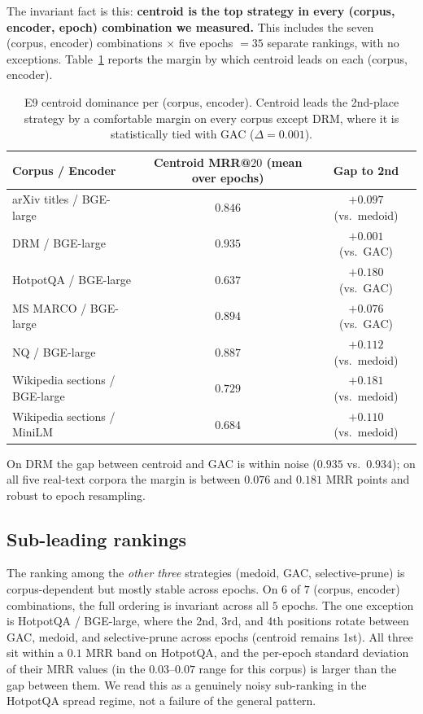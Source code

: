 The invariant fact is this: \textbf{centroid is the top strategy in
every (corpus, encoder, epoch) combination we measured.} This
includes the seven (corpus, encoder) combinations
$\times$ five epochs $= 35$ separate rankings, with no exceptions.
Table~\ref{tab:e9-centroid} reports the margin by which centroid
leads on each (corpus, encoder).

\begin{table}[h]
\centering
\small
\begin{tabular}{lcc}
\toprule
Corpus / Encoder & Centroid MRR@$20$ (mean over epochs) & Gap to 2nd \\
\midrule
arXiv titles / BGE-large        & $0.846$ & $+0.097$ (vs.\ medoid) \\
DRM / BGE-large                  & $0.935$ & $+0.001$ (vs.\ GAC) \\
HotpotQA / BGE-large             & $0.637$ & $+0.180$ (vs.\ GAC) \\
MS MARCO / BGE-large             & $0.894$ & $+0.076$ (vs.\ GAC) \\
NQ / BGE-large                   & $0.887$ & $+0.112$ (vs.\ medoid) \\
Wikipedia sections / BGE-large   & $0.729$ & $+0.181$ (vs.\ medoid) \\
Wikipedia sections / MiniLM      & $0.684$ & $+0.110$ (vs.\ medoid) \\
\bottomrule
\end{tabular}
\caption{E9 centroid dominance per (corpus, encoder). Centroid leads
the 2nd-place strategy by a comfortable margin on every corpus
except DRM, where it is statistically tied with GAC
($\Delta = 0.001$).}
\label{tab:e9-centroid}
\end{table}

On DRM the gap between centroid and GAC is within noise ($0.935$
vs.\ $0.934$); on all five real-text corpora the margin is between
$0.076$ and $0.181$ MRR points and robust to epoch resampling.

\subsection{Sub-leading rankings}
\label{sec:e9:sub-leading}

The ranking among the \emph{other three} strategies (medoid, GAC,
selective-prune) is corpus-dependent but mostly stable across
epochs. On $6$ of $7$ (corpus, encoder) combinations, the full
ordering is invariant across all $5$ epochs. The one exception is
HotpotQA / BGE-large, where the 2nd, 3rd, and 4th positions rotate
between GAC, medoid, and selective-prune across epochs (centroid
remains 1st). All three sit within a $0.1$ MRR band on HotpotQA,
and the per-epoch standard deviation of their MRR values
(in the $0.03$--$0.07$ range for this corpus) is larger than the
gap between them. We read this as a genuinely noisy sub-ranking in
the HotpotQA spread regime, not a failure of the general pattern.

